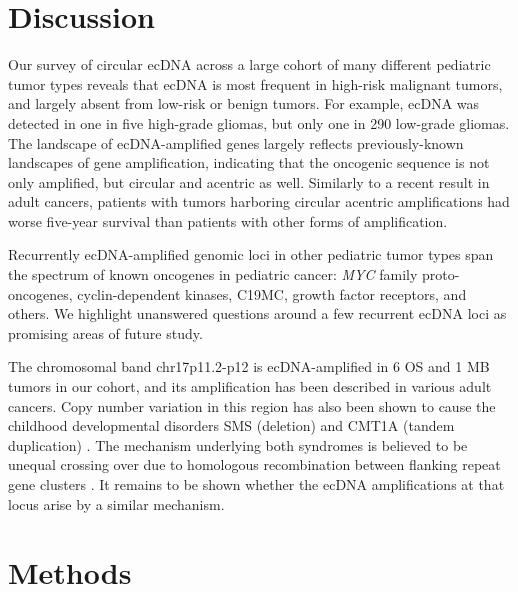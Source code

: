 
\section{Discussion}

Our survey of circular ecDNA across a large cohort of many different pediatric tumor types reveals that ecDNA is most frequent in high-risk malignant tumors, and largely absent from low-risk or benign tumors. For example, ecDNA was detected in one in five high-grade gliomas, but only one in 290 low-grade gliomas. The landscape of ecDNA-amplified genes largely reflects previously-known landscapes of gene amplification, indicating that the oncogenic sequence is not only amplified, but circular and acentric as well. Similarly to a recent result in adult cancers, patients with tumors harboring circular acentric amplifications had worse five-year survival than patients with other forms of amplification.

\par Recurrently ecDNA-amplified genomic loci in other pediatric tumor types span the spectrum of known oncogenes in pediatric cancer: \textit{MYC} family proto-oncogenes, cyclin-dependent kinases, C19MC, growth factor receptors, and others. We highlight unanswered questions around a few recurrent ecDNA loci as promising areas of future study.

\par The chromosomal band chr17p11.2-p12 is ecDNA-amplified in 6 \gls{OS} and 1 \gls{MB} tumors in our cohort, and its amplification has been described in various adult cancers. Copy number variation in this region has also been shown to cause the childhood developmental disorders \gls{SMS} (deletion) \cite{gropman_2006} and \gls{CMT1A} (tandem duplication) \cite{thomas_1997}. The mechanism underlying both syndromes is believed to be unequal crossing over due to homologous recombination between flanking repeat gene clusters \cite{potocki_2000}. It remains to be shown whether the ecDNA amplifications at that locus arise by a similar mechanism.

\section{Methods}

